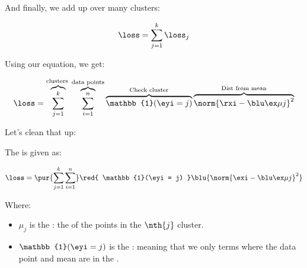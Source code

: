         And finally, we add up over many clusters:
        
        \begin{equation}
            \loss = \sum_{j=1}^k \loss_j
        \end{equation}
        
        Using our equation, we get:
        
        \begin{equation*}
                \loss =
                \overbrace{
                    \sum_{j=1}^k
                }^{\text{clusters }}
                \overbrace{
                \sum_{i=1}^n 
                }^{\text{data points}}
                    \overbrace{
                        \mathbb{1}(\eyi = j)
                    }^{ \text{Check cluster}}
                    \overbrace{
                        \norm{ \rxi - \bmuj }^2 
                    }^{\text{Dist from mean} }
            \end{equation*}
            
            Let's clean that up:\\
        
        \begin{kequation}
            The  is given as:
            
            \begin{equation*}
                \loss =
                \pur{
                    \sum_{j=1}^k \sum_{i=1}^n
                }
                \red{
                    \mathbb{1}(\eyi = j)
                }
                \blu{
                    \norm{ \exi - \bmuj }^2 
                }
            \end{equation*}
            
            Where:
            
            \begin{itemize}
                \item $\mu_j$ is the : the  of the points in the $\nth{j}$ cluster.
                
                \item $\mathbb{1}(\eyi = j)$ is the : meaning that we only  terms where the data point and mean are in the .
            \end{itemize}
        \end{kequation}